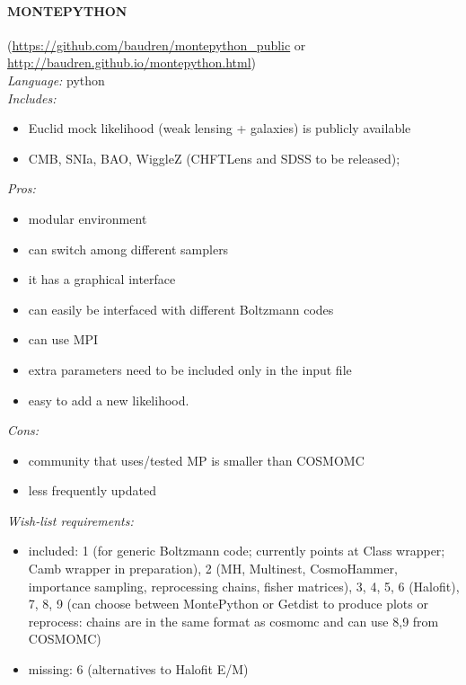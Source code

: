 \paragraph{MONTEPYTHON}(\url{https://github.com/baudren/montepython_public} or \url{http://baudren.github.io/montepython.html})\\
{\it Language:} python\\
{\it Includes:}
\begin{itemize}
 \item Euclid mock likelihood (weak lensing + galaxies) is publicly available
 \item CMB, SNIa, BAO, WiggleZ (CHFTLens and SDSS to be released); 
\end{itemize}
{\it Pros: }
\begin{itemize}
 \item modular environment
 \item can switch among different samplers
 \item it has a graphical interface
 \item can easily be interfaced with different Boltzmann codes
 \item can use MPI
 \item extra parameters need to be included only in the input file
 \item easy to add a new likelihood.
\end{itemize}
{\it Cons:} 
\begin{itemize}
 \item community that uses/tested MP is smaller than COSMOMC
 \item less frequently updated 
\end{itemize}
{\it Wish-list requirements: }
\begin{itemize}
 \item included: 1 (for generic Boltzmann code; currently points at Class wrapper; Camb wrapper in preparation), 2 (MH, Multinest, CosmoHammer, importance sampling, reprocessing chains, fisher matrices), 3, 4, 5, 6 (Halofit), 7, 8, 9 (can choose between MontePython or Getdist to produce plots or reprocess: chains are in the same format as cosmomc and can use 8,9 from COSMOMC) 
 \item missing: 6 (alternatives to Halofit E/M) 
\end{itemize}

